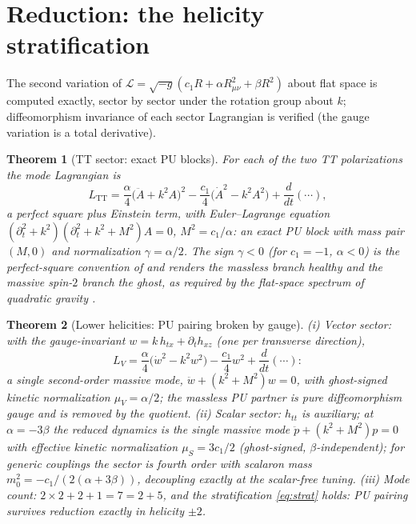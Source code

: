 \documentclass[11pt]{article}
\newtheorem{theorem}{Theorem}[section]
\theoremstyle{definition}
\theoremstyle{remark}
\begin{document}
\section{Reduction: the helicity stratification}\label{sec:reduction}

The second variation of
$\mathcal L=\sqrt{-g}(c_1R+\alpha R_{\mu\nu}^2+\beta R^2)$ about flat
space is computed exactly, sector by sector under the rotation group about
$k$; diffeomorphism invariance of each sector Lagrangian is verified (the
gauge variation is a total derivative).

\begin{theorem}[TT sector: exact PU blocks]\label{thm:tt}
For each of the two TT polarizations the mode Lagrangian is
\begin{equation}\label{eq:LTT}
L_{\mathrm{TT}}
=\frac{\alpha}{4}\big(\ddot A+k^2A\big)^2
-\frac{c_1}{4}\big(\dot A^2-k^2A^2\big)+\frac{d}{dt}(\cdots),
\end{equation}
a perfect square plus Einstein term, with Euler--Lagrange equation
$(\partial_t^2+k^2)(\partial_t^2+k^2+M^2)A=0$, $M^2=c_1/\alpha$: an exact
PU block with mass pair $(M,0)$ and normalization $\gamma=\alpha/2$.  The
sign $\gamma<0$ (for $c_1=-1$, $\alpha<0$) is the perfect-square
convention of \cite{BT2026} and renders the \emph{massless} branch healthy
and the massive spin-$2$ branch the ghost, as required by the flat-space
spectrum of quadratic gravity \cite{Stelle}.
\end{theorem}

\begin{theorem}[Lower helicities: PU pairing broken by gauge]
\label{thm:lower}
(i) Vector sector: with the gauge-invariant $w=k\,h_{tx}+\partial_t
h_{xz}$ (one per transverse direction),
\begin{equation}
L_V=\frac{\alpha}{4}\big(\dot w^2-k^2w^2\big)-\frac{c_1}{4}w^2
+\frac{d}{dt}(\cdots):
\end{equation}
a single second-order massive mode, $\ddot w+(k^2+M^2)w=0$, with
ghost-signed kinetic normalization $\mu_V=\alpha/2$; the massless PU
partner is pure diffeomorphism gauge and is removed by the quotient.
(ii) Scalar sector: $h_{tt}$ is auxiliary; at $\alpha=-3\beta$ the reduced
dynamics is the single massive mode $\ddot p+(k^2+M^2)p=0$ with effective
kinetic normalization $\mu_S=3c_1/2$ (ghost-signed, $\beta$-independent);
for generic couplings the sector is fourth order with scalaron mass
$m_0^2=-c_1/(2(\alpha+3\beta))$, decoupling exactly at the scalar-free
tuning.  (iii) Mode count: $2\times2+2+1=7=2+5$, and the stratification
\eqref{eq:strat} holds: PU pairing survives reduction exactly in helicity
$\pm2$.
\end{theorem}
\end{document}
